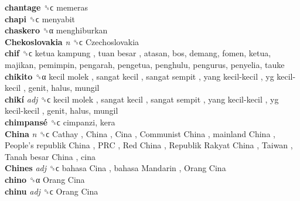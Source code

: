 \textbf{chantage} ␝ϲ  memeras  \\
\textbf{chapi} ␝ϲ  menyabit  \\
\textbf{chaskero} ␝α  menghiburkan  \\
\textbf{Chekoslovakia} \emph{n}  ␝ϲ   Czechoslovakia   \\
\textbf{chif} ␝ϲ   ketua kampung ,  tuan besar , atasan, bos, demang, fomen, ketua, majikan, pemimpin, pengarah, pengetua, penghulu, pengurus, penyelia, tauke  \\
\textbf{chikito} ␝α   kecil molek ,  sangat kecil ,  sangat sempit ,  yang kecil-kecil ,  yg kecil-kecil , genit, halus, mungil  \\
\textbf{chikí} \emph{adj}  ␝ϲ   kecil molek ,  sangat kecil ,  sangat sempit ,  yang kecil-kecil ,  yg kecil-kecil , genit, halus, mungil  \\
\textbf{chimpansé} ␝ϲ  cimpanzi, kera  \\
\textbf{China} \emph{n}  ␝ϲ   Cathay ,  China ,  Cina ,  Communist China ,  mainland China ,  People’s republik China ,  PRC ,  Red China ,  Republik Rakyat China ,  Taiwan ,  Tanah besar China , cina  \\
\textbf{Chines} \emph{adj}  ␝ϲ   bahasa Cina ,  bahasa Mandarin ,  Orang Cina   \\
\textbf{chino} ␝α   Orang Cina   \\
\textbf{chinu} \emph{adj}  ␝ϲ   Orang Cina   \\
